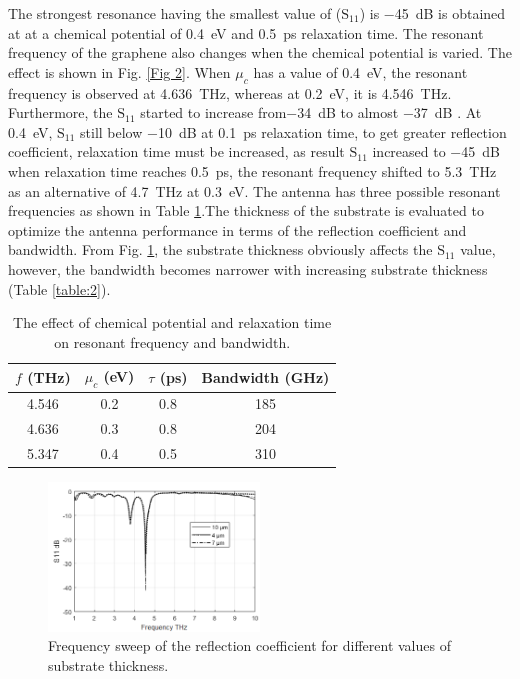 \documentclass[12pt]{suhbook}
\begin{document}
The strongest resonance having the smallest value of ($\mathrm{S_{11}}$) is \SI{-45}{\dB} is obtained at at a chemical potential of \SI{0.4}{\eV} and \SI{0.5}{\ps} relaxation time. The resonant frequency of the graphene also changes when the chemical potential is varied. The effect is shown in Fig. \ref{Fig 2}. When $\mu_c$ has a value of \SI{0.4}{\eV}, the resonant frequency is observed at \SI{4.636}{\THz}, whereas at \SI{0.2}{\eV}, it is \SI{4.546}{\THz}. Furthermore,  the $\mathrm{S_{11}}$ started to increase from\SI{-34}{\dB} to almost \SI{-37}{\dB} . At \SI{0.4}{\eV}, $\mathrm{S_{11}}$ still below \SI{-10}{\dB} at \SI{0.1}{\ps } relaxation time, to get greater reflection coefficient, relaxation time must be increased, as result $\mathrm{S_{11}}$ increased to \SI{-45}{\dB} when relaxation time reaches \SI{0.5}{\ps }, the resonant frequency shifted to \SI{5.3}{\THz} as an alternative of \SI{4.7}{\THz} at \SI{0.3}{\eV}. The antenna has three possible resonant frequencies as shown in Table \ref{table:1}.The thickness of the substrate is evaluated to optimize the antenna performance in terms of the reflection coefficient and bandwidth. From Fig. \ref{Fig 3}, the substrate thickness obviously affects the $\mathrm{S_{11}}$ value, however, the bandwidth becomes narrower with increasing substrate thickness (Table \ref{table:2}).
% 
\begin{table}[hbt!]
\centering
 \begin{tabular}[hbt!]{|c | c |c |c|} 
 \hline
 $f$ (THz) & $\mu_c$ (eV) & $\tau$ (ps) & Bandwidth (GHz)\\ [0.5ex] 
 \hline
 4.546  & 0.2  & 0.8  & 185  \\ 
 \hline
 4.636  & 0.3  & 0.8  & 204  \\
 \hline
 5.347  & 0.4  & 0.5  & 310  \\
 \hline
\end{tabular}
\caption{The effect of chemical potential and relaxation time on resonant frequency and bandwidth.}
\label{table:1}
\end{table}
% 
% 
\begin{figure}[hbt!]
    \centering
    \includegraphics[width=0.5\textwidth]{3}
    \caption{Frequency sweep of the reflection coefficient for different values of substrate thickness.}
    \label{Fig 3}
\end{figure}
\end{document}
